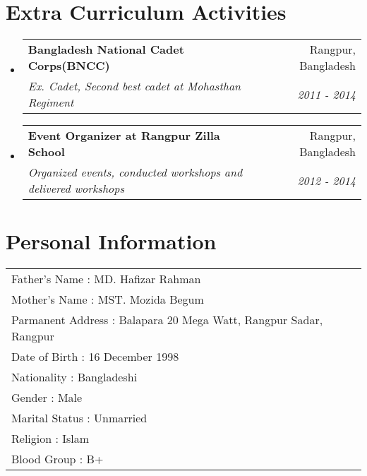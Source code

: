 \documentclass[a4paper,20pt]{article}
\makeatletter
\newcommand{\resumeSubheading}[4]{
  \vspace{-1pt}\item
    \begin{tabular*}{0.97\textwidth}{l@{\extracolsep{\fill}}r}
      \textbf{#1} & #2 \\
      \textit{#3} & \textit{#4} \\
    \end{tabular*}\vspace{-5pt}
}
\newcommand{\resumeSubHeadingListStart}{\begin{itemize}[leftmargin=*]}
\newcommand{\resumeSubHeadingListEnd}{\end{itemize}}
\makeatother
\begin{document}
\section{Extra Curriculum Activities}
  \resumeSubHeadingListStart
	\resumeSubheading
    {Bangladesh National Cadet Corps(BNCC)}{Rangpur, Bangladesh}
    {Ex. Cadet, Second best cadet at Mohasthan Regiment}{2011 - 2014}
\vspace{1pt}
    \resumeSubheading
    {Event Organizer at Rangpur Zilla School}{Rangpur, Bangladesh}
    {Organized events, conducted workshops and delivered workshops}{2012 - 2014}

\resumeSubHeadingListEnd

\vspace{5pt}

\section{Personal Information}
\resumeSubHeadingListStart
\begin{tabular}{l l}
Father's Name \hspace{10.5mm} : \hspace{2mm} MD. Hafizar Rahman \\
Mother's Name \hspace{9.4mm} : \hspace{2mm} MST. Mozida Begum \\
Parmanent Address \hspace{2.8mm} : \hspace{2mm} Balapara 20 Mega Watt, Rangpur Sadar, Rangpur \\
Date of Birth \hspace{12.5mm} : \hspace{2mm} 16 December 1998 \\
Nationality \hspace{16mm} : \hspace{2mm} Bangladeshi \\
Gender \hspace{22.2mm} : \hspace{2mm} Male \\
Marital Status \hspace{11mm} : \hspace{2mm} Unmarried \\
Religion \hspace{20.7mm} : \hspace{2mm} Islam \\
Blood Group \hspace{13.3mm} : \hspace{2mm} B+ \\
\end{tabular}
\resumeSubHeadingListEnd
\end{document}
